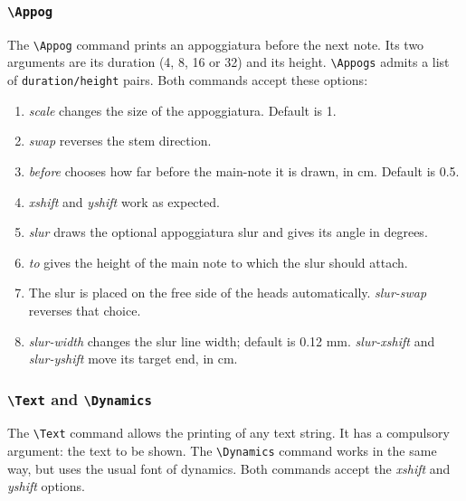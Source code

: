 \documentclass[final]{article}
\newcommand{\TTT}[2][0]{\Text[yshift=#1]{\texttt{\textbackslash #2}}}
\begin{document}
	
	\subsubsection{\texttt{\textbackslash Appog}}
	The \verb|\Appog| command prints an appoggiatura before the next note. Its two arguments are its duration (4, 8, 16 or 32) and its height. 
	\verb|\Appogs| admits a list of \texttt{duration/height} pairs. Both commands accept these options:
	\begin{enumerate}[-]
	\item \textsl{scale} changes the size of the appoggiatura. Default is 1.
	\item \textsl{swap} reverses the stem direction.
	\item \textsl{before} chooses how far before the main-note it is drawn, in cm. Default is 0.5. 
	\item \textsl{xshift} and \textsl{yshift} work as expected.
	\item \textsl{slur} draws the optional appoggiatura slur and gives its angle in degrees.
	\item \textsl{to} gives the height of the main note to which the slur should attach.
	\item The slur is placed on the free side of the heads automatically. \textsl{slur-swap} reverses that choice.
	\item \textsl{slur-width} changes the slur line width; default is 0.12 mm. \textsl{slur-xshift} and \textsl{slur-yshift} move its target end, in cm.
	\end{enumerate}

	\begin{center}
	\begin{mousik}
		\Clef
		\Space
		\TTT{Appogs[swap,slur=30,to=9,scale=0.75]\{,,,,,8/10\}}
		\TTT[-0.5]{Note[swap,stem=6]\{16\}\{7,3,4,8,,9,8\}}
		\Space[-1]
		\Barline[t=|.]
	\end{mousik}
	\end{center}


	\subsubsection{\texttt{\textbackslash Text} and \texttt{\textbackslash Dynamics}}
	The \verb|\Text| command allows the printing of any text string. It has a compulsory argument: the text to be shown.
	The \verb|\Dynamics| command works in the same way, but uses the usual font of dynamics. Both commands accept the \textsl{xshift} and \textsl{yshift} options.
	
\end{document}
